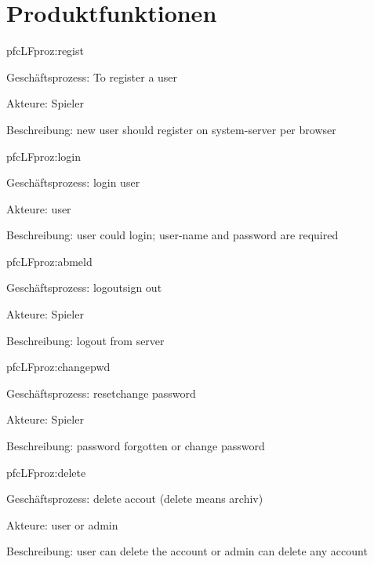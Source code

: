 \chapter{Produktfunktionen}

\setcounter{pfc}{10}

\begin{description}[leftmargin=5em, style=sameline]

	\begin{lhp}{pfc}{LF}{proz:regist}
		\item [Geschäftsprozess:] To register a user
		\item [Akteure:] Spieler
		\item [Beschreibung:] new user should register on system-server per browser
	\end{lhp}
	
	\begin{lhp}{pfc}{LF}{proz:login}
		\item [Geschäftsprozess:] login user
		\item [Akteure:] user
		\item [Beschreibung:] user could login; user-name and password are required
		
	\end{lhp}

	\begin{lhp}{pfc}{LF}{proz:abmeld}
		\item [Geschäftsprozess:] logout\/sign out
		\item [Akteure:] Spieler
		\item [Beschreibung:] logout from server
	\end{lhp}

	\begin{lhp}{pfc}{LF}{proz:changepwd}
		\item [Geschäftsprozess:] reset\/change password
		\item [Akteure:] Spieler
		\item [Beschreibung:] password forgotten or change password
	\end{lhp}
	
	
	\begin{lhp}{pfc}{LF}{proz:delete}
		\item [Geschäftsprozess:] delete accout  (delete means archiv)
		\item [Akteure:] user or admin
		\item [Beschreibung:] user can delete the account or admin can delete any account
	\end{lhp}
	

\end{description}
